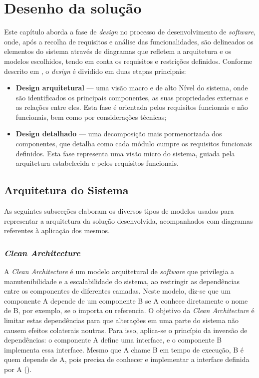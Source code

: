 
\chapter{Desenho da solução}
\label{chap:DS}

Este capítulo aborda a fase de \textit{design} no processo de desenvolvimento de \textit{software}, onde, após a recolha de requisitos e análise das funcionalidades, são delineados os elementos do sistema através de diagramas que refletem a arquitetura e os modelos escolhidos, tendo em conta os requisitos e restrições definidos. Conforme descrito em \cite{tsui2022essentials}, o \textit{design} é dividido em duas etapas principais:

\begin{itemize}
    \item \textbf{Design arquitetural} — uma visão macro e de alto Nível do sistema, onde são identificados os principais componentes, as suas propriedades externas e as relações entre eles. Esta fase é orientada pelos requisitos funcionais e não funcionais, bem como por considerações técnicas;
    \item \textbf{Design detalhado} — uma decomposição mais pormenorizada dos componentes, que detalha como cada módulo cumpre os requisitos funcionais definidos. Esta fase representa uma visão micro do sistema, guiada pela arquitetura estabelecida e pelos requisitos funcionais.
\end{itemize}


\section{Arquitetura do Sistema} 

As seguintes subsecções elaboram os diversos tipos de modelos usados para representar a arquitetura da solução desenvolvida, acompanhados com diagramas referentes à aplicação dos mesmos.

\subsection{\textit{Clean Architecture}}

A \textit{Clean Architecture} é um modelo arquitetural de \textit{software} que privilegia a manutenibilidade e a escalabilidade do sistema, ao restringir as dependências entre os componentes de diferentes camadas. Neste modelo, diz-se que um componente A depende de um componente B se A conhece diretamente o nome de B, por exemplo, se o importa ou referencia. O objetivo da \textit{Clean Architecture} é limitar estas dependências para que alterações em uma parte do sistema não causem efeitos colaterais noutras. Para isso, aplica-se o princípio da inversão de dependências: o componente A define uma interface, e o componente B implementa essa interface. Mesmo que A chame B em tempo de execução, B é quem depende de A, pois precisa de conhecer e implementar a interface definida por A (\cite{Lano2023}).

